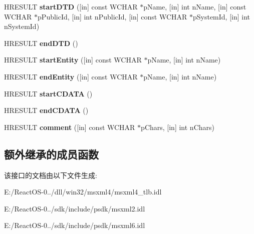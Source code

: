 \begin{DoxyCompactItemize}
\item 
\mbox{\label{interface_m_s_x_m_l2_1_1_i_s_a_x_lexical_handler_a9dc751b2bda45f399fbf6840e72a1248}} 
H\+R\+E\+S\+U\+LT {\bfseries start\+D\+TD} (\mbox{[}in\mbox{]} const W\+C\+H\+AR $\ast$p\+Name, \mbox{[}in\mbox{]} int n\+Name, \mbox{[}in\mbox{]} const W\+C\+H\+AR $\ast$p\+Public\+Id, \mbox{[}in\mbox{]} int n\+Public\+Id, \mbox{[}in\mbox{]} const W\+C\+H\+AR $\ast$p\+System\+Id, \mbox{[}in\mbox{]} int n\+System\+Id)
\item 
\mbox{\label{interface_m_s_x_m_l2_1_1_i_s_a_x_lexical_handler_ae998805090d10f27b3e349a410d7583e}} 
H\+R\+E\+S\+U\+LT {\bfseries end\+D\+TD} ()
\item 
\mbox{\label{interface_m_s_x_m_l2_1_1_i_s_a_x_lexical_handler_abd6b0f77da7917b1f52b494e028bad61}} 
H\+R\+E\+S\+U\+LT {\bfseries start\+Entity} (\mbox{[}in\mbox{]} const W\+C\+H\+AR $\ast$p\+Name, \mbox{[}in\mbox{]} int n\+Name)
\item 
\mbox{\label{interface_m_s_x_m_l2_1_1_i_s_a_x_lexical_handler_a8ea421b901347b2bf441d230f1a62740}} 
H\+R\+E\+S\+U\+LT {\bfseries end\+Entity} (\mbox{[}in\mbox{]} const W\+C\+H\+AR $\ast$p\+Name, \mbox{[}in\mbox{]} int n\+Name)
\item 
\mbox{\label{interface_m_s_x_m_l2_1_1_i_s_a_x_lexical_handler_aad16b9ac4f18c8fe10cdab176202fd45}} 
H\+R\+E\+S\+U\+LT {\bfseries start\+C\+D\+A\+TA} ()
\item 
\mbox{\label{interface_m_s_x_m_l2_1_1_i_s_a_x_lexical_handler_a4bfd40c57cec0cdc15e19724934bfccd}} 
H\+R\+E\+S\+U\+LT {\bfseries end\+C\+D\+A\+TA} ()
\item 
\mbox{\label{interface_m_s_x_m_l2_1_1_i_s_a_x_lexical_handler_a872a71206758098ed46b26aba0550c05}} 
H\+R\+E\+S\+U\+LT {\bfseries comment} (\mbox{[}in\mbox{]} const W\+C\+H\+AR $\ast$p\+Chars, \mbox{[}in\mbox{]} int n\+Chars)
\end{DoxyCompactItemize}
\subsection*{额外继承的成员函数}


该接口的文档由以下文件生成\+:\begin{DoxyCompactItemize}
\item 
E\+:/\+React\+O\+S-\/0../dll/win32/msxml4/msxml4\+\_\+tlb.\+idl\item 
E\+:/\+React\+O\+S-\/0../sdk/include/psdk/msxml2.\+idl\item 
E\+:/\+React\+O\+S-\/0../sdk/include/psdk/msxml6.\+idl\end{DoxyCompactItemize}
